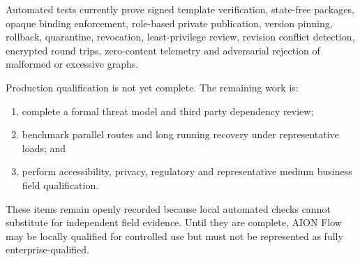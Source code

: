 Automated tests currently prove signed template verification, state-free packages, opaque binding
enforcement, role-based private publication, version pinning, rollback, quarantine, revocation,
least-privilege review, revision conflict detection, encrypted round trips, zero-content telemetry
and adversarial rejection of malformed or excessive graphs.

Production qualification is not yet complete. The remaining work is:

\begin{enumerate}
  \item complete a formal threat model and third party dependency review;
  \item benchmark parallel routes and long running recovery under representative loads; and
  \item perform accessibility, privacy, regulatory and representative medium business field
        qualification.
\end{enumerate}

These items remain openly recorded because local automated checks cannot substitute for independent
field evidence. Until they are complete, AION Flow may be locally qualified for controlled use but
must not be represented as fully enterprise-qualified.
